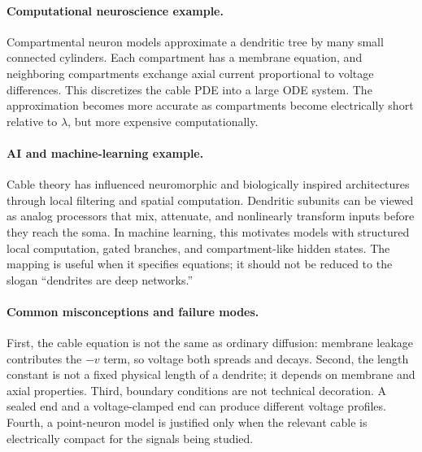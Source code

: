 \paragraph{Computational neuroscience example.}
Compartmental neuron models approximate a dendritic tree by many small connected cylinders. Each compartment has a membrane equation, and neighboring compartments exchange axial current proportional to voltage differences. This discretizes the cable PDE into a large ODE system. The approximation becomes more accurate as compartments become electrically short relative to \(\lambda\), but more expensive computationally.

\paragraph{AI and machine-learning example.}
Cable theory has influenced neuromorphic and biologically inspired architectures through local filtering and spatial computation. Dendritic subunits can be viewed as analog processors that mix, attenuate, and nonlinearly transform inputs before they reach the soma. In machine learning, this motivates models with structured local computation, gated branches, and compartment-like hidden states. The mapping is useful when it specifies equations; it should not be reduced to the slogan ``dendrites are deep networks.''

\paragraph{Common misconceptions and failure modes.}
First, the cable equation is not the same as ordinary diffusion: membrane leakage contributes the \(-v\) term, so voltage both spreads and decays. Second, the length constant is not a fixed physical length of a dendrite; it depends on membrane and axial properties. Third, boundary conditions are not technical decoration. A sealed end and a voltage-clamped end can produce different voltage profiles. Fourth, a point-neuron model is justified only when the relevant cable is electrically compact for the signals being studied.

